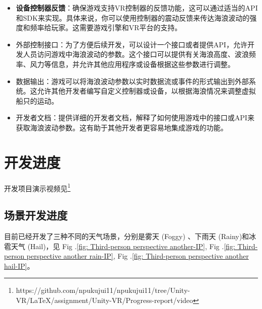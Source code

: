 \documentclass[a4paper,10pt]{article}
\begin{document}
		
		\begin{itemize}
			\item[(1)] 
			\textbf{设备控制器反馈}：确保游戏支持VR控制器的反馈功能，这可以通过适当的API和SDK来实现。具体来说，你可以使用控制器的震动反馈来传达海浪波动的强度和频率给玩家。这需要游戏引擎和VR平台的支持。
			
			\item[(2)]
			外部控制接口：为了方便后续开发，可以设计一个接口或者提供API，允许开发人员访问游戏中海浪波动的参数。这个接口可以提供有关海浪高度、波浪频率、风力等信息，并允许其他应用程序或设备根据这些参数进行调整。
			
			\item[(3)]
			数据输出：游戏可以将海浪波动参数以实时数据流或事件的形式输出到外部系统。这允许其他开发者编写自定义控制器或设备，以根据海浪情况来调整虚拟船只的运动。
			
			\item[(4)]
			开发者文档：提供详细的开发者文档，解释了如何使用游戏中的接口或API来获取海浪波动参数。这有助于其他开发者更容易地集成游戏的功能。
			
		\end{itemize}	
		
	\section{开发进度}
	
		开发项目演示视频见\footnote{https://github.com/npukujui11/npukujui11/tree/Unity-VR/LaTeX/assignment/Unity-VR/Progress-report/video}
	
		\subsection{场景开发进度}
		
		目前已经开发了三种不同的天气场景，分别是雾天 (Foggy) 、下雨天 (Rainy)和冰雹天气 (Hail)，见 Fig .\ref{fig: Third-person perspective another-IP}, Fig .\ref{fig: Third-person perspective another rain-IP}, Fig .\ref{fig: Third-person perspective another hail-IP}。
		
\end{document}

